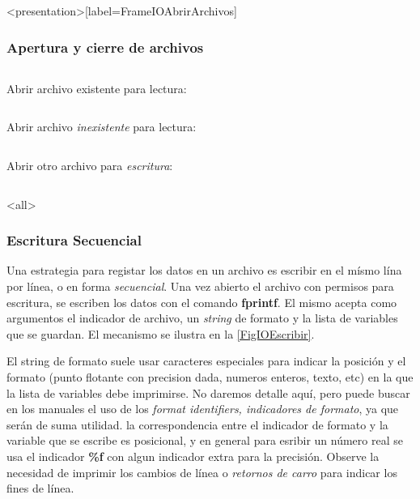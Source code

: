 \begin{frame}<presentation>[label=FrameIOAbrirArchivos]
  \frametitle{Apertura y cierre de archivos}

  \begin{columns}[T]
    \hfill Abrir archivo existente para lectura:
    \begin{codeblock}
      
    \end{codeblock}
  \end{columns}

  \begin{columns}[T]
    \hfill Abrir archivo \emph{inexistente} para lectura:
    \begin{codeblock}
      
    \end{codeblock}
  \end{columns}

  \begin{columns}[T]
    \hfill Abrir otro archivo  para \emph{escritura}:
    \begin{codeblock}
      
    \end{codeblock}
  \end{columns}

\end{frame}

\mode<all>

\subsubsection{Escritura Secuencial}


Una estrategia para registar los datos en un archivo es 
escribir en el mísmo lína por línea, o en forma \emph{secuencial}.
Una vez abierto el archivo con permisos para escritura, 
se escriben los datos con el comando \textbf{fprintf}. 
El mismo acepta como argumentos el indicador de archivo, 
un \emph{string} de formato y la lista de variables 
que se guardan. El mecanismo se ilustra en la 
\autoref{FigIOEscribir}.

El string de formato suele usar caracteres especiales para indicar
la posición y el formato (punto flotante con precision dada, numeros enteros,
texto, etc) en la que la lista de variables debe 
imprimirse. No daremos detalle aquí, pero puede
buscar en los manuales el uso de los \emph{format 
identifiers, indicadores de formato}, ya que serán 
de suma utilidad. la correspondencia entre el 
indicador de formato y la variable que se escribe
es posicional, y en general para esribir un número 
real se usa el indicador \textbf{\%f} con algun 
indicador extra para la precisión. 
Observe la necesidad de imprimir los cambios de línea
o \emph{retornos de carro} para indicar los fines de línea. 

